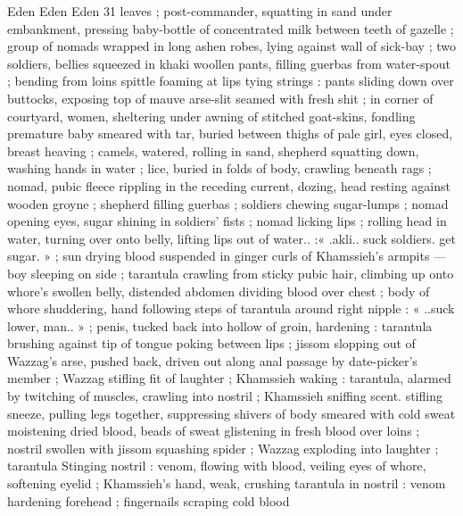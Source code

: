 Eden Eden Eden 31
leaves ; post-commander, squatting in sand under embankment,
pressing baby-bottle of concentrated milk between teeth of gazelle
; group of nomads wrapped in long ashen robes, lying against wall
of sick-bay ; two soldiers, bellies squeezed in khaki woollen pants,
filling guerbas from water-spout ; bending from loins spittle foaming
at lips tying strings : pants sliding down over buttocks, exposing top
of mauve arse-slit seamed with fresh shit ; in corner of courtyard,
women, sheltering under awning of stitched goat-skins, fondling
premature baby smeared with tar, buried between thighs of pale girl,
eyes closed, breast heaving ; camels, watered, rolling in sand,
shepherd squatting down, washing hands in water ; lice, buried in
folds of body, crawling beneath rags ; nomad, pubic fleece rippling
in the receding current, dozing, head resting against wooden groyne
; shepherd filling guerbas ; soldiers chewing sugar-lumps ; nomad
opening eyes, sugar shining in soldiers’ fists ; nomad licking lips ;
rolling head in water, turning over onto belly, lifting lips out of water..
:« .akli.. suck soldiers. get sugar. » ; sun drying blood suspended
in ginger curls of Khamssieh's armpits — boy sleeping on side ;
tarantula crawling from sticky pubic hair, climbing up onto whore's
swollen belly, distended abdomen dividing blood over chest ; body of
whore shuddering, hand following steps of tarantula around right
nipple : « ..suck lower, man.. » ; penis, tucked back into hollow of
groin, hardening : tarantula brushing against tip of tongue poking
between lips ; jissom slopping out of Wazzag's arse, pushed back,
driven out along anal passage by date-picker's member ; Wazzag
stifling fit of laughter ; Khamssieh waking : tarantula, alarmed by
twitching of muscles, crawling into nostril ; Khamssieh sniffing scent.
stifling sneeze, pulling legs together, suppressing shivers of body
smeared with cold sweat moistening dried blood, beads of sweat
glistening in fresh blood over loins ; nostril swollen with jissom
squashing spider ; Wazzag exploding into laughter ; tarantula
Stinging nostril : venom, flowing with blood, veiling eyes of whore,
softening eyelid ; Khamssieh's hand, weak, crushing tarantula in
nostril : venom hardening forehead ; fingernails scraping cold blood

